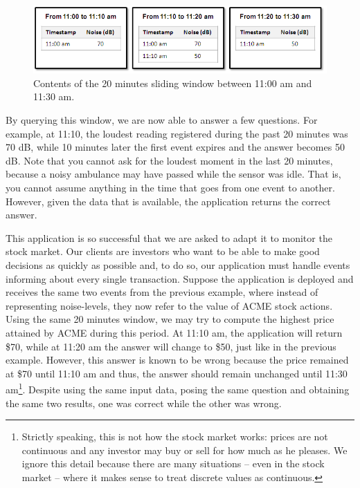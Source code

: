 \begin{figure}[htpb]
  \includegraphics[width=\textwidth]{window-contents.png}
  \caption{Contents of the 20 minutes sliding window between 11:00 am
    and 11:30 am.}
  \label{fig:window-contents}
\end{figure}

By querying this window, we are now able to answer a few
questions. For example, at 11:10, the loudest reading registered
during the past 20 minutes was 70 dB, while 10 minutes later the
first event expires and the answer becomes 50 dB. Note that you cannot
ask for the loudest moment in the last 20 minutes, because a noisy
ambulance may have passed while the sensor was idle. That is, you
cannot assume anything in the time that goes from one event to
another. However, given the data that is available, the application
returns the correct answer.

This application is so successful that we are asked to adapt it to
monitor the stock market. Our clients are investors who want to be
able to make good decisions as quickly as possible and, to do so, our
application must handle events informing about every single
transaction. Suppose the application is deployed and receives the same
two events from the previous example, where instead of representing
noise-levels, they now refer to the value of ACME stock actions. Using
the same 20 minutes window, we may try to compute the highest price
attained by ACME during this period. At 11:10 am, the application will
return \$70, while at 11:20 am the answer will change to \$50, just
like in the previous example. However, this answer is known to be
wrong because the price remained at \$70 until 11:10 am and thus, the
answer should remain unchanged until 11:30 am\footnote{Strictly
  speaking, this is not how the stock market works: prices are not
  continuous and any investor may buy or sell for how much as he
  pleases. We ignore this detail because there are many situations --
  even in the stock market -- where it makes sense to treat discrete
  values as continuous.}. Despite using the same input data, posing
the same question and obtaining the same two results, one was correct
while the other was wrong.

